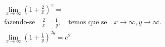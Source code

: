 \begin{ex}
\begin{align}
&\lim_{x\rightarrow \infty} \left(1+\frac{2}{x}\right)^x=\nonumber\\
&\text{fazendo-se}\quad\frac{2}{x}=\frac{1}{y},\quad\text{temos que se}\quad x\rightarrow \infty, y\rightarrow \infty.\nonumber\\
&\lim_{x\rightarrow \infty} \left(1+\frac{1}{y}\right)^{2y}=e^2\nonumber
\end{align}
\end{ex}
